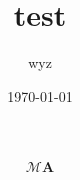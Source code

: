 \documentclass{article}
\title{test}
\author{wyz}
\date{\today}
\begin{document}
\[
  \mathcal{M} \bm{A} 

\]
\end{document}
